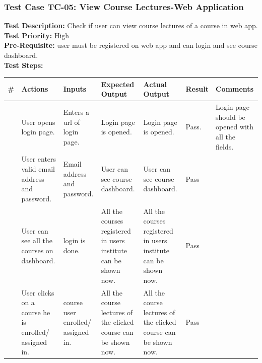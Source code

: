 \documentclass[12pt]{article}
\begin{document}
\subsubsection{Test Case TC-05: View Course Lectures-Web Application}
\textbf{Test Description: } Check if user can view course lectures of a course in web app. \\
\textbf{Test Priority: } High \\
\textbf{Pre-Requisite: } user must be registered on web app and can login and see course dashboard. \\
\textbf{Test Steps: }
\newpage
\begin{longtable}{ |>{\raggedright\arraybackslash} p{0.7cm} | >{\raggedright\arraybackslash}p{2cm}|>{\raggedright\arraybackslash} p{2cm} |>{\raggedright\arraybackslash} p{2.5cm} |>{\raggedright\arraybackslash} p{2.5cm} |>{\raggedright\arraybackslash} p{1.3cm} |>{\raggedright\arraybackslash} p{2.5cm} | } 
\hline
\textbf{\#}
& \textbf{Actions} 
& \textbf{Inputs}
& \textbf{Expected Output} 
& \textbf{Actual Output} 
& \textbf{Result} 
& \textbf{Comments} 
\\ 
\hline
1
& User opens login page. 
& Enters a url of login page.
& Login page is opened.
& Login page is opened.
& Pass.
& Login page should be opened with all the fields.
\\ 
\hline
2 
& User enters valid email address and password.
& Email address and password.
& User can see course dashboard.
& User can see course dashboard. 
& Pass
&  
\\ 
\hline
3
& User can see all the courses on dashboard.
& login is done.
& All the courses registered in users institute can be shown now.
& All the courses registered in users institute can be shown now. 
& Pass
&  
\\ 
\hline
4
& User clicks on a course he is enrolled/ assigned in.
& course user enrolled/ assigned in.
& All the course lectures of the clicked course can be shown now.
& All the course lectures of the clicked course can be shown now. 
& Pass
&  
\\ 
\hline

\end{longtable}
\end{document}
